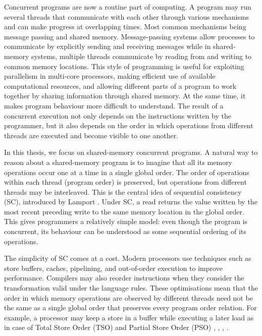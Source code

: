 
Concurrent programs are now a routine part of computing. A program may run several threads that communicate with each other through various mechanisms and can make progress at overlapping times. Most common mechanisms being message passing and shared memory.
Message-passing systems allow processes to communicate by explicitly sending and receiving messages while  in shared-memory systems, multiple threads communicate by reading from and writing to common memory locations. This style of programming is useful for exploiting parallelism in multi-core processors, making  efficient use of available computational resources, and allowing different parts of a program to work together by sharing information through shared  memory. At the same time, it makes program behaviour more difficult to understand. The result of a concurrent execution not only depends  on the instructions written by the programmer, but it also depends on the order in which operations from different threads are executed and become visible to one another. 

In this thesis, we focus on shared-memory concurrent programs. A natural way to reason about a shared-memory program is to imagine that all its memory operations occur one at a time in a single global order. The order of operations within each thread (program order) is preserved, but operations from different threads may be interleaved. This is the central idea of sequential consistency (SC), introduced by Lamport \cite{SC-Lamport78}. Under SC, a read returns the value written by the most recent preceding write to the same memory location in the global order. This gives programmers a relatively simple model: even though the program is concurrent, its behaviour can be understood as some sequential ordering of its operations.

The simplicity of SC comes at a cost. Modern processors use techniques such as store buffers, caches, pipelining, and out-of-order execution to improve performance. Compilers may also reorder instructions when they consider the transformation valid under the language rules. These optimisations mean that the order in which memory operations are observed by different threads need not be the same as a single global order that preserves every program order relation. For example, a processor may keep a store in a buffer while executing a later load as in case of Total Store Order (TSO) and Partial Store Order (PSO) \cite{sun1991sparc}, \cite{sparc1994architecture}, \cite{gharachorloo1990memory}, \cite{dubois1986memory}.
 
